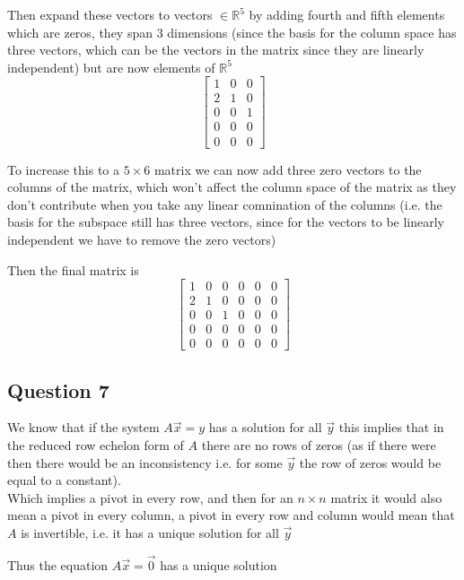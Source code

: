 \documentclass{article}
\begin{document}
Then expand these vectors to vectors \(\in \mathbb{R}^5\) by adding fourth and fifth elements which
are zeros, they span 3 dimensions (since the basis for the column space has three vectors, which can be the vectors in the matrix since they are linearly independent) 
but are now elements of \(\mathbb{R}^5\)
\[
\begin{bmatrix}
    1&0&0 \\
    2&1&0 \\
    0&0&1 \\
    0&0&0 \\
    0&0&0
\end{bmatrix}
\]

To increase this to a \(5 \times 6\) matrix we can now add three zero vectors to the columns
of the matrix, which won't affect the column space of the matrix as they don't contribute
when you take any linear comnination of the columns (i.e. the basis for the subspace still has three vectors, since for the vectors to be linearly independent we have to remove the zero vectors)

Then the final matrix is
\[
\begin{bmatrix}
    1&0&0&0&0&0 \\
    2&1&0&0&0&0 \\
    0&0&1&0&0&0\\
    0&0&0&0&0&0 \\
    0&0&0&0&0&0
\end{bmatrix}
\]

\subsection*{Question 7}
We know that if the system \(A\vec{x} = y\) has a solution for all \(\vec{y}\) this implies 
that in the reduced row echelon form of \(A\) there are no rows of zeros 
(as if there were then there would be an inconsistency
i.e. for some \(\vec{y}\) the row of zeros would be equal to a constant).
\\

Which implies a pivot in every row, and then for an \(n \times n \) matrix
it would also mean a pivot in every column, a pivot in every row and column
would mean that \(A\) is invertible, i.e. it has a unique solution for all \(\vec{y}\)

Thus the equation \(A\vec{x} = \vec{0}\) has a unique solution
\end{document}
